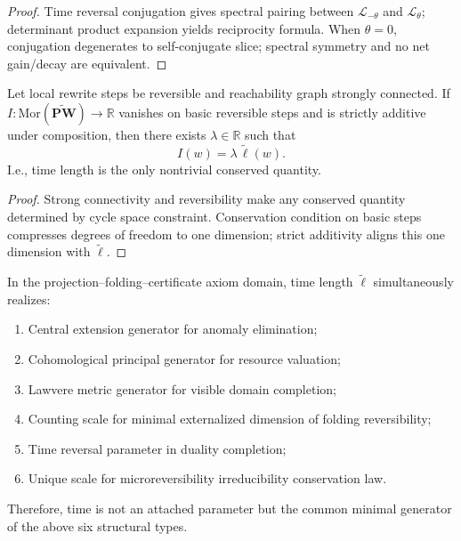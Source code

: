 \begin{proof}
Time reversal conjugation gives spectral pairing between \(\mathcal L_{-\theta}\) and \(\mathcal L_\theta\); determinant product expansion yields reciprocity formula.
When \(\theta=0\), conjugation degenerates to self-conjugate slice; spectral symmetry and no net gain/decay are equivalent.
\end{proof}

\begin{theorem}\label{thm:xi-time-only-conserved-quantity}
Let local rewrite steps be reversible and reachability graph strongly connected.
If \(I:\mathrm{Mor}(\widetilde{\mathbf{PW}})\to\mathbb R\) vanishes on basic reversible steps and is strictly additive under composition, then there exists \(\lambda\in\mathbb R\) such that
\[
I(w)=\lambda\,\widetilde\ell(w).
\]
I.e., time length is the only nontrivial conserved quantity.
\end{theorem}

\begin{proof}
Strong connectivity and reversibility make any conserved quantity determined by cycle space constraint.
Conservation condition on basic steps compresses degrees of freedom to one dimension; strict additivity aligns this one dimension with \(\widetilde\ell\).
\end{proof}

\begin{theorem}\label{thm:xi-time-unified-semantic-generator}
In the projection--folding--certificate axiom domain, time length \(\widetilde\ell\) simultaneously realizes:
\begin{enumerate}
  \item Central extension generator for anomaly elimination;
  \item Cohomological principal generator for resource valuation;
  \item Lawvere metric generator for visible domain completion;
  \item Counting scale for minimal externalized dimension of folding reversibility;
  \item Time reversal parameter in duality completion;
  \item Unique scale for microreversibility irreducibility conservation law.
\end{enumerate}
Therefore, time is not an attached parameter but the common minimal generator of the above six structural types.
\end{theorem}

